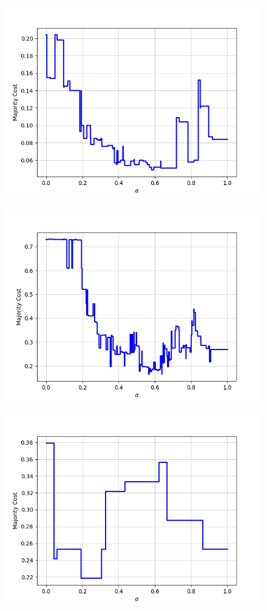 \begin{figure}[h]
\begin{minipage}{.24\textwidth}
  {\includegraphics[width=\linewidth]{plots/nell-ac/event}}
\end{minipage}
\begin{minipage}{.24\textwidth}
  \centering
  {\includegraphics[width=\linewidth]{plots/nell-ac/food}}
\end{minipage}
\begin{minipage}{.24\textwidth}
  \centering
  {\includegraphics[width=\linewidth]{plots/nell-ac/fruit}}

\end{minipage}
\end{figure}
